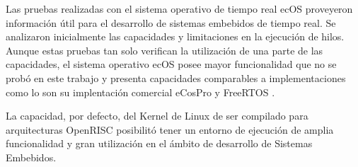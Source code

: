 Las pruebas realizadas con el sistema operativo de tiempo real ecOS proveyeron información útil para el desarrollo de sistemas embebidos de tiempo
real. Se analizaron inicialmente las capacidades y limitaciones en la ejecución de hilos. Aunque estas pruebas tan solo verifican la utilización de
una parte de las capacidades, el sistema operativo ecOS posee mayor funcionalidad que no se probó en este trabajo y presenta capacidades comparables
a implementaciones como lo son su implentación comercial eCosPro y FreeRTOS .
	
La capacidad, por defecto, del Kernel de Linux de ser compilado para arquitecturas OpenRISC posibilitó tener un entorno de ejecución de amplia
funcionalidad y gran utilización en el ámbito de desarrollo de Sistemas Embebidos.
	
